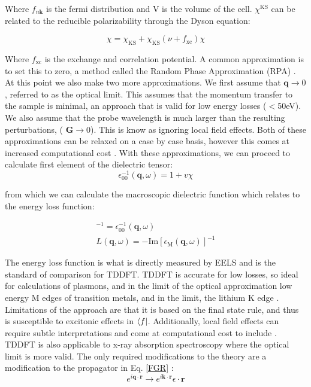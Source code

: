 Where $f_{n\textbf{k}}$ is the fermi distribution and V is the volume of the cell.  $\chi^{\mathrm{KS}}$ can be related to the reducible polarizability through the Dyson equation:  

\begin{equation}
\chi = \chi_{\mathrm{KS}} + \chi_{\mathrm{KS}}(\nu + f_{\mathrm{xc}})\chi
\end{equation}

Where $f_{\mathrm{xc}}$ is the exchange and correlation potential.  A common approximation is to set this to zero, a method called the Random Phase Approximation (RPA) \cite{optic}.  At this point we also make two more approximations.  We first assume that $\textbf{q} \to 0$, referred to as the optical limit.  This assumes that the momentum transfer to the sample is minimal, an approach that is valid for low energy losses ($<$50eV).  We also assume that the probe wavelength is much larger than the resulting perturbations, ($\textbf{ G} \to 0$). This is know as ignoring local field effects.  Both of these approximations can be relaxed on a case by case basis, however this comes at increased computational cost \cite{exciting}. With these approximations, we can proceed to calculate first element of the dielectric tensor: 
\begin{equation}
\epsilon_{\mathrm{00}}^{-1} (\textbf{q},\omega) =1+v \chi
\end{equation}

from which we can calculate the macroscopic dielectric function which relates to the energy loss function: 

\begin{gather}
[\epsilon_{\mathrm{M}}(\textbf{q},\omega)]^{-1} = \epsilon_{\mathrm{00}}^{-1}(\textbf{q},\omega)\\
	L(\textbf{q},\omega) = -\mathrm{Im}[\epsilon_{\mathrm{M}}(\textbf{q},\omega)]^{-1}
\end{gather}

The energy loss function is what is directly measured by EELS and is the standard of comparison for TDDFT. TDDFT is accurate for low losses, so ideal for calculations of plasmons, and in the limit of the optical approximation low energy M edges of transition metals, and in the limit, the lithium K edge \cite{mauchamp_local_2008}.  Limitations of the approach are that it is based on the final state rule, and thus is susceptible to excitonic effects in $\bra{f}$.  Additionally, local field effects can require subtle interpretations and come at computational cost to include \cite{mauchamp_local_2008}.    TDDFT is also applicable to x-ray absorption spectroscopy where the optical limit is more valid.  The only required modifications to the theory are a modification to the propagator in Eq. \ref{FGR} \cite{ankudinov_real-space_1998}:
\begin{equation}
e^{i\textbf{q}\cdot\textbf{r}} \to e^{i\textbf{k}\cdot\textbf{r}}\epsilon \cdot \textbf{r}
\label{x-prop}
\end{equation}


